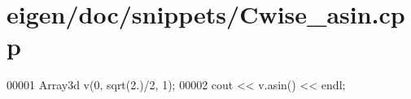 \hypertarget{eigen_2doc_2snippets_2_cwise__asin_8cpp_source}{}\section{eigen/doc/snippets/\+Cwise\+\_\+asin.cpp}
\label{eigen_2doc_2snippets_2_cwise__asin_8cpp_source}

\begin{DoxyCode}
00001 Array3d v(0, sqrt(2.)/2, 1);
00002 cout << v.asin() << endl;
\end{DoxyCode}

